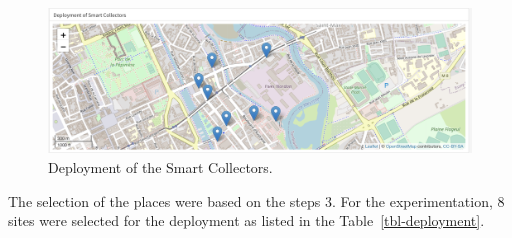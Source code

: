 \documentclass[
  11pt,
]{article}
\begin{document}
\begin{figure}[H]

{\centering \includegraphics{figures/SC/Deployment.png}

}

\caption{\label{fig-sc-deployment}Deployment of the Smart Collectors.}

\end{figure}

The selection of the places were based on the steps 3. For the
experimentation, 8 sites were selected for the deployment as listed in
the Table~\ref{tbl-deployment}.
\end{document}
